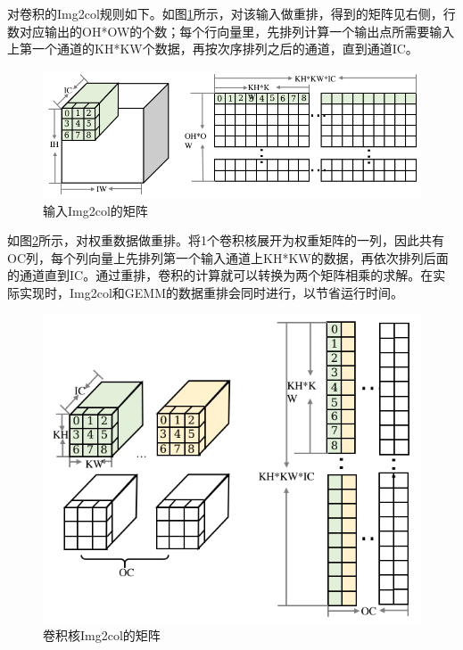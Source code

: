 对卷积的Img2col规则如下。如图\ref{fig:ch09/ch09-img2col_input}所示，对该输入做重排，得到的矩阵见右侧，行数对应输出的OH*OW的个数；每个行向量里，先排列计算一个输出点所需要输入上第一个通道的KH*KW个数据，再按次序排列之后的通道，直到通道IC。

\begin{figure}[h]
\centering
\includegraphics[scale=0.85]{figs/ch09/ch09-img2col_input.png}
\caption{输入Img2col的矩阵}
\label{fig:ch09/ch09-img2col_input}
\end{figure}

如图\ref{fig:ch09/ch09-img2col_weight}所示，对权重数据做重排。将1个卷积核展开为权重矩阵的一列，因此共有OC列，每个列向量上先排列第一个输入通道上KH*KW的数据，再依次排列后面的通道直到IC。通过重排，卷积的计算就可以转换为两个矩阵相乘的求解。在实际实现时，Img2col和GEMM的数据重排会同时进行，以节省运行时间。

\begin{figure}[h]
\centering
\includegraphics[scale=0.85]{figs/ch09/ch09-img2col_weight.png}
\caption{卷积核Img2col的矩阵}
\label{fig:ch09/ch09-img2col_weight}
\end{figure}

